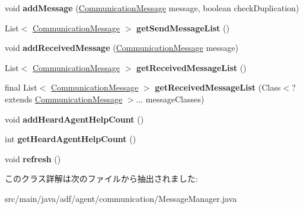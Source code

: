 \begin{DoxyCompactItemize}
\item 
\hypertarget{classadf_1_1agent_1_1communication_1_1MessageManager_a445e867769a47fa04501ff9bed32c6f7}{}\label{classadf_1_1agent_1_1communication_1_1MessageManager_a445e867769a47fa04501ff9bed32c6f7} 
void {\bfseries add\+Message} (\hyperlink{classadf_1_1component_1_1communication_1_1CommunicationMessage}{Communication\+Message} message, boolean check\+Duplication)
\item 
\hypertarget{classadf_1_1agent_1_1communication_1_1MessageManager_a56927f8055dc3949d2cafeba97aecde4}{}\label{classadf_1_1agent_1_1communication_1_1MessageManager_a56927f8055dc3949d2cafeba97aecde4} 
List$<$ \hyperlink{classadf_1_1component_1_1communication_1_1CommunicationMessage}{Communication\+Message} $>$ {\bfseries get\+Send\+Message\+List} ()
\item 
\hypertarget{classadf_1_1agent_1_1communication_1_1MessageManager_a4076a624c7c86d1f06eaf21b02517518}{}\label{classadf_1_1agent_1_1communication_1_1MessageManager_a4076a624c7c86d1f06eaf21b02517518} 
void {\bfseries add\+Received\+Message} (\hyperlink{classadf_1_1component_1_1communication_1_1CommunicationMessage}{Communication\+Message} message)
\item 
\hypertarget{classadf_1_1agent_1_1communication_1_1MessageManager_a47ccf7490e73c9301e97b5b777dedae9}{}\label{classadf_1_1agent_1_1communication_1_1MessageManager_a47ccf7490e73c9301e97b5b777dedae9} 
List$<$ \hyperlink{classadf_1_1component_1_1communication_1_1CommunicationMessage}{Communication\+Message} $>$ {\bfseries get\+Received\+Message\+List} ()
\item 
\hypertarget{classadf_1_1agent_1_1communication_1_1MessageManager_abb2325441740fac0e5a5791e2630c5bf}{}\label{classadf_1_1agent_1_1communication_1_1MessageManager_abb2325441740fac0e5a5791e2630c5bf} 
final List$<$ \hyperlink{classadf_1_1component_1_1communication_1_1CommunicationMessage}{Communication\+Message} $>$ {\bfseries get\+Received\+Message\+List} (Class$<$? extends \hyperlink{classadf_1_1component_1_1communication_1_1CommunicationMessage}{Communication\+Message} $>$... message\+Classes)
\item 
\hypertarget{classadf_1_1agent_1_1communication_1_1MessageManager_a49c7d9417cf1f7e794bc83448e3f707e}{}\label{classadf_1_1agent_1_1communication_1_1MessageManager_a49c7d9417cf1f7e794bc83448e3f707e} 
void {\bfseries add\+Heard\+Agent\+Help\+Count} ()
\item 
\hypertarget{classadf_1_1agent_1_1communication_1_1MessageManager_aabf301db913e2f729563921eb27abe3b}{}\label{classadf_1_1agent_1_1communication_1_1MessageManager_aabf301db913e2f729563921eb27abe3b} 
int {\bfseries get\+Heard\+Agent\+Help\+Count} ()
\item 
\hypertarget{classadf_1_1agent_1_1communication_1_1MessageManager_abee15a64cb90093c36d27b603c47277a}{}\label{classadf_1_1agent_1_1communication_1_1MessageManager_abee15a64cb90093c36d27b603c47277a} 
void {\bfseries refresh} ()
\end{DoxyCompactItemize}


このクラス詳解は次のファイルから抽出されました\+:\begin{DoxyCompactItemize}
\item 
src/main/java/adf/agent/communication/Message\+Manager.\+java\end{DoxyCompactItemize}
